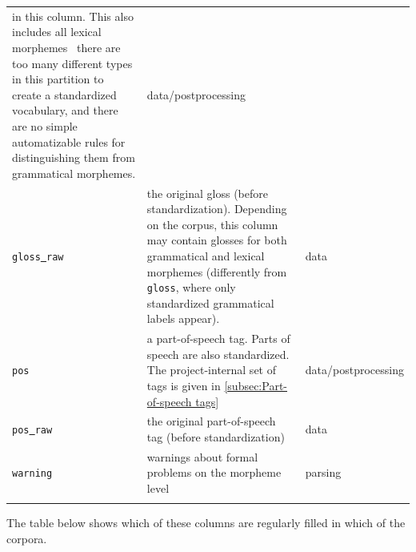 \documentclass[a4paper, 11pt]{book}
\newcommand{\und}{\underline{{ }}\hspace{0.2mm}}	%
\begin{document}
\begin{longtable}{lp{.5\linewidth}p{.2\linewidth}}
								  in this column. This also includes all lexical morphemes \textendash\ there are too many different types in this partition
								  to create a standardized vocabulary, and there are no simple automatizable rules for distinguishing them from
								  grammatical morphemes. & data/postprocessing \\
		\texttt{gloss\und raw} 	& the original gloss (before standardization). Depending on the corpus, this column may contain glosses for both
			 					  grammatical and lexical morphemes (differently from \texttt{gloss}, where only standardized grammatical labels appear). & data \\
		\texttt{pos} 			& a part-of-speech tag. Parts of speech are also standardized. The project-internal set of tags is given in
			 					  \autoref{subsec:Part-of-speech tags} & data/postprocessing \\
		
		\texttt{pos\und raw} 	& the original part-of-speech tag (before standardization) & data \\
		\texttt{warning}		& warnings about formal problems on the morpheme level & parsing \\[-0.3cm]

	\label{tab:Table morphemes}
\end{longtable}

The table below shows which of these columns are regularly filled in which of the corpora. 
\end{document}
